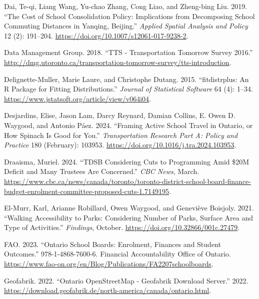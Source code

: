 \documentclass[
default
]{sn-jnl}
\newlength{\cslhangindent}
\newenvironment{CSLReferences}[2] %
 {\begin{list}{}{%
  \setlength{\itemindent}{0pt}
  \setlength{\leftmargin}{0pt}
  \setlength{\parsep}{0pt}
  \ifodd #1
   \setlength{\leftmargin}{\cslhangindent}
   \setlength{\itemindent}{-1\cslhangindent}
  \fi
  \setlength{\itemsep}{#2\baselineskip}}}
 {\end{list}}
\begin{document}
\begin{CSLReferences}{1}{0}
Dai, Te-qi, Liang Wang, Yu-chao Zhang, Cong Liao, and Zheng-bing Liu.
2019. {``The Cost of School Consolidation Policy: Implications from
Decomposing School Commuting Distances in Yanqing, Beijing.''}
\emph{Applied Spatial Analysis and Policy} 12 (2): 191--204.
\url{https://doi.org/10.1007/s12061-017-9238-2}.

Data Management Group. 2018. {``{TTS} - {Transportation} {Tomorrow}
{Survey} 2016.''}
\url{http://dmg.utoronto.ca/transportation-tomorrow-survey/tts-introduction}.

Delignette-Muller, Marie Laure, and Christophe Dutang. 2015.
{``{fitdistrplus}: An {R} Package for Fitting Distributions.''}
\emph{Journal of Statistical Software} 64 (4): 1--34.
\url{https://www.jstatsoft.org/article/view/v064i04}.

Desjardins, Elise, Jason Lam, Darcy Reynard, Damian Collins, E. Owen D.
Waygood, and Antonio Páez. 2024. {``Framing Active School Travel in
{Ontario}, or How Spinach Is Good for You.''} \emph{Transportation
Research Part A: Policy and Practice} 180 (February): 103953.
\url{https://doi.org/10.1016/j.tra.2024.103953}.

Draaisma, Muriel. 2024. {``{TDSB} Considering Cuts to Programming Amid
\$20M Deficit and Many Trustees Are Concerned.''} \emph{{CBC} News},
March.
\url{https://www.cbc.ca/news/canada/toronto/toronto-district-school-board-finance-budget-enrolment-committee-proposed-cuts-1.7149195}.

El-Murr, Karl, Arianne Robillard, Owen Waygood, and Geneviève Boisjoly.
2021. {``Walking Accessibility to Parks: Considering Number of Parks,
Surface Area and Type of Activities.''} \emph{Findings}, October.
\url{https://doi.org/10.32866/001c.27479}.

FAO. 2023. {``Ontario School Boards: Enrolment, Finances and Student
Outcomes.''} 978-1-4868-7600-6. Financial Accountability Office of
Ontario.
\url{https://www.fao-on.org/en/Blog/Publications/FA2207schoolboards}.

Geofabrik. 2022. {``Ontario {OpenStreetMap} - {Geofabrik Download
Server}.''} 2022.
\url{https://download.geofabrik.de/north-america/canada/ontario.html}.


\end{CSLReferences}
\end{document}
